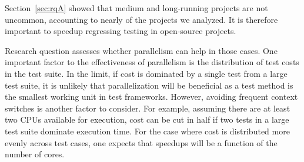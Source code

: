 Section~\ref{sec:rqA} showed that medium and long-running projects are
not uncommon, accounting to nearly \percentMedLongRunning{} of the
\numSubjs{} projects we analyzed.  It is therefore important to
speedup regressing testing in open-source projects.

Research question \numRQB{} assesses whether parallelism can help in
those cases.  One important factor to the effectiveness of parallelism
is the distribution of test costs in the test suite.  In the limit, if
cost is dominated by a single test from a large test suite, it is
unlikely that parallelization will be beneficial as a test method is
the smallest working unit in test frameworks.  However, avoiding
frequent context switches is another factor to consider.  For example,
assuming there are at least two CPUs available for execution, cost can
be cut in half if two tests in a large test suite dominate execution
time. For the case where cost is distributed more evenly across test
cases, one expects that speedups will be a function of the number of
cores.


